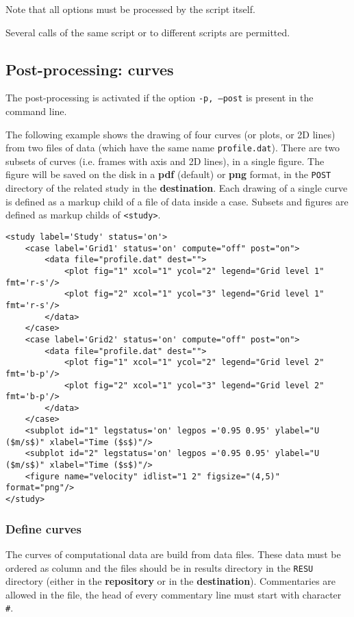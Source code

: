 \documentclass[a4paper,10pt,twoside]{csshortdoc}
\begin{document}
Note that all options must be processed by the script itself.

Several calls of the same script or to different scripts are permitted.

\subsection{Post-processing: curves}\label{sec:curves}

The post-processing is activated if the option \texttt{-p, --post} is present
in the command line.

The following example shows the drawing of four curves (or plots, or 2D lines)
from two files of data (which have the same name \texttt{profile.dat}). There
are two subsets of curves (i.e. frames with axis and 2D lines), in a single
figure. The figure will be saved on the disk in a \textbf{pdf} (default)
or \textbf{png} format, in the \texttt{POST} directory of the related study
in the \textbf{destination}. Each drawing of a single curve is defined as a
markup child of a file of data inside a case. Subsets and figures are defined
as markup childs of \texttt{<study>}.

\small
\begin{verbatim}
<study label='Study' status='on'>
    <case label='Grid1' status='on' compute="off" post="on">
        <data file="profile.dat" dest="">
            <plot fig="1" xcol="1" ycol="2" legend="Grid level 1" fmt='r-s'/>
            <plot fig="2" xcol="1" ycol="3" legend="Grid level 1" fmt='r-s'/>
        </data>
    </case>
    <case label='Grid2' status='on' compute="off" post="on">
        <data file="profile.dat" dest="">
            <plot fig="1" xcol="1" ycol="2" legend="Grid level 2" fmt='b-p'/>
            <plot fig="2" xcol="1" ycol="3" legend="Grid level 2" fmt='b-p'/>
        </data>
    </case>
    <subplot id="1" legstatus='on' legpos ='0.95 0.95' ylabel="U ($m/s$)" xlabel="Time ($s$)"/>
    <subplot id="2" legstatus='on' legpos ='0.95 0.95' ylabel="U ($m/s$)" xlabel="Time ($s$)"/>
    <figure name="velocity" idlist="1 2" figsize="(4,5)" format="png"/>
</study>
\end{verbatim}
\normalsize

\subsubsection{Define curves}

The curves of computational data are build from data files. These data must be
ordered as column and the files should be in results directory in the
\texttt{RESU} directory (either in the \textbf{repository} or in the
\textbf{destination}). Commentaries are allowed in the file, the head of every
commentary line must start with character \texttt{\#}.
\end{document}
